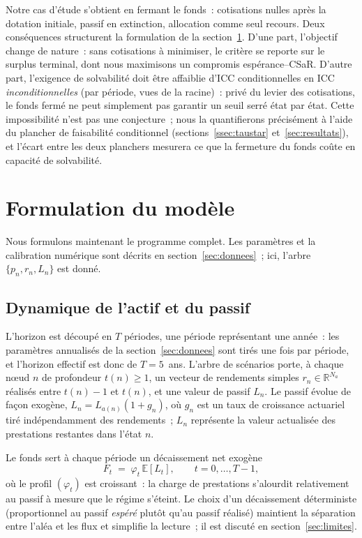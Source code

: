 \documentclass[11pt,letterpaper]{article}
\newcommand{\E}{\mathbb{E}}
\newcommand{\R}{\mathbb{R}}
\theoremstyle{definition}
\begin{document}
Notre cas d'étude s'obtient en fermant le fonds~: cotisations nulles après la
dotation initiale, passif en extinction, allocation comme seul recours. Deux
conséquences structurent la formulation de la section~\ref{sec:modele}. D'une part,
l'objectif change de nature~: sans cotisations à minimiser, le critère se reporte
sur le surplus terminal, dont nous maximisons un compromis
espérance--CSaR. D'autre part, l'exigence de solvabilité doit être affaiblie
d'ICC conditionnelles en ICC \emph{inconditionnelles} (par période, vues de la
racine)~: privé du levier des cotisations, le fonds fermé ne peut simplement pas
garantir un seuil serré état par état. Cette impossibilité n'est pas une conjecture~;
nous la quantifierons précisément à l'aide du plancher de faisabilité conditionnel
(sections~\ref{ssec:taustar} et~\ref{sec:resultats}), et l'écart entre les deux
planchers mesurera ce que la fermeture du fonds coûte en capacité de solvabilité.

\section{Formulation du modèle}\label{sec:modele}

Nous formulons maintenant le programme complet. Les paramètres et la calibration
numérique sont décrits en section~\ref{sec:donnees}~; ici, l'arbre
$\{p_n, r_n, L_n\}$ est donné.

\subsection{Dynamique de l'actif et du passif}\label{ssec:dynamique}

L'horizon est découpé en $T$ périodes, une période représentant une année~: les
paramètres annualisés de la section~\ref{sec:donnees} sont tirés une fois par
période, et l'horizon effectif est donc de $T = 5$~ans. L'arbre de scénarios
porte, à chaque n\oe ud
$n$ de profondeur $t(n) \ge 1$, un vecteur de rendements simples
$r_n \in \R^{N_a}$ réalisés entre $t(n)-1$ et $t(n)$, et une valeur de passif
$L_n$. Le passif évolue de façon exogène,
$L_n = L_{a(n)} (1 + g_n)$, où $g_n$ est un taux de croissance actuariel tiré
indépendamment des rendements~; $L_n$ représente la valeur actualisée des
prestations restantes dans l'état $n$.

Le fonds sert à chaque période un décaissement net exogène
\begin{equation}\label{eq:decaissement}
F_t \;=\; \varphi_t \,\E[L_t], \qquad t = 0, \dots, T-1,
\end{equation}
où le profil $(\varphi_t)$ est croissant~: la charge de prestations s'alourdit
relativement au passif à mesure que le régime s'éteint. Le choix d'un décaissement
déterministe (proportionnel au passif \emph{espéré} plutôt qu'au passif réalisé)
maintient la séparation entre l'aléa et les flux et simplifie la lecture~; il est
discuté en section~\ref{sec:limites}.
\end{document}
